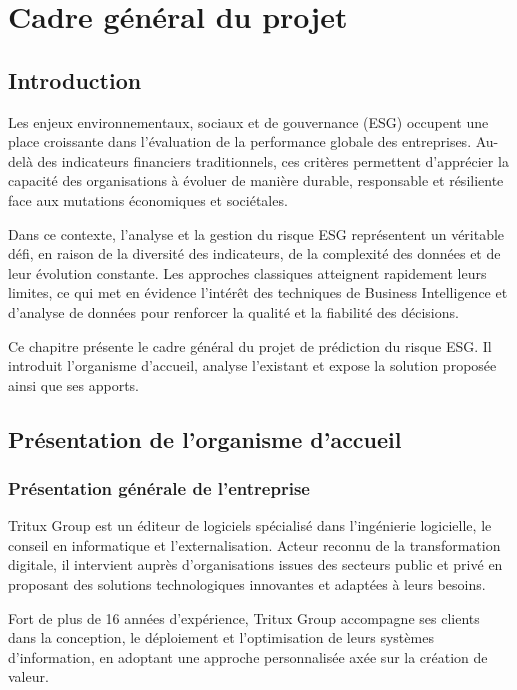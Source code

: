 \chapter{Cadre général du projet}

\section*{Introduction}

Les enjeux environnementaux, sociaux et de gouvernance (ESG) occupent une place
croissante dans l'évaluation de la performance globale des entreprises. Au-delà des
indicateurs financiers traditionnels, ces critères permettent d'apprécier la capacité
des organisations à évoluer de manière durable, responsable et résiliente face aux
mutations économiques et sociétales.

Dans ce contexte, l'analyse et la gestion du risque ESG représentent un véritable défi,
en raison de la diversité des indicateurs, de la complexité des données et de leur
évolution constante. Les approches classiques atteignent rapidement leurs limites,
ce qui met en évidence l'intérêt des techniques de Business Intelligence et d'analyse
de données pour renforcer la qualité et la fiabilité des décisions.

Ce chapitre présente le cadre général du projet de prédiction du risque ESG. Il introduit
l'organisme d'accueil, analyse l'existant et expose la solution proposée ainsi que ses
apports.

\section{Présentation de l'organisme d'accueil}

\subsection{Présentation générale de l'entreprise}

Tritux Group est un éditeur de logiciels spécialisé dans l'ingénierie logicielle, le conseil
en informatique et l'externalisation. Acteur reconnu de la transformation digitale, il
intervient auprès d'organisations issues des secteurs public et privé en proposant des
solutions technologiques innovantes et adaptées à leurs besoins.

Fort de plus de 16 années d'expérience, Tritux Group accompagne ses clients dans la
conception, le déploiement et l'optimisation de leurs systèmes d'information, en
adoptant une approche personnalisée axée sur la création de valeur.

